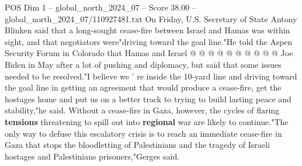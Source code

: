 \begin{textsample}{POS Dim 1 – global\_north\_2024\_07 – Score 38.00 – global\_north\_2024\_07/110927481.txt}
On Friday, U.S.
Secretary of State Antony Blinken said that a long-sought cease-fire between Israel and Hamas was within sight, and that negotiators were"driving toward the goal line."He told the Aspen Security Forum in Colorado that Hamas and Israel @ @ @ @ @ @ @ @ @ @ Joe Biden in May after a lot of pushing and diplomacy, but said that some issues needed to be resolved."I believe we ' re inside the 10-yard line and driving toward the goal line in getting an agreement that would produce a cease-fire, get the hostages home and put us on a better track to trying to build lasting peace and stability,"he said.
Without a cease-fire in Gaza, however, the cycles of flaring \textbf{tensions} threatening to spill out into \textbf{regional} war are likely to continue."The only way to defuse this escalatory crisis is to reach an immediate cease-fire in Gaza that stops the bloodletting of Palestinians and the tragedy of Israeli hostages and Palestinians prisoners,"Gerges said.

\end{textsample}
